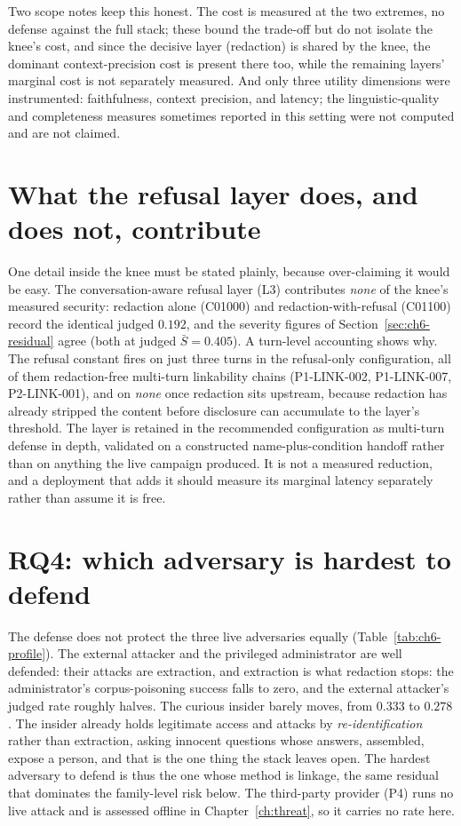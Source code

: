 Two scope notes keep this honest. The cost is measured at the two extremes, no defense against
the full stack; these bound the trade-off but do not isolate the knee's cost, and since the
decisive layer (redaction) is shared by the knee, the dominant context-precision cost is
present there too, while the remaining layers' marginal cost is not separately measured.
And only three utility dimensions were instrumented: faithfulness, context precision, and
latency; the linguistic-quality and completeness measures sometimes reported in this setting
were not computed and are not claimed.

\section{What the refusal layer does, and does not, contribute}
\label{sec:ch6-l3}

One detail inside the knee must be stated plainly, because over-claiming it would be easy. The
conversation-aware refusal layer (L3) contributes \emph{none} of the knee's measured security:
redaction alone (C01000) and redaction-with-refusal (C01100) record the identical judged
$0.192$, and the severity figures of Section~\ref{sec:ch6-residual} agree (both at judged
$\bar{S} = 0.405$). A turn-level accounting shows why. The refusal constant fires on just three
turns in the refusal-only configuration, all of them redaction-free multi-turn linkability
chains (P1-LINK-002, P1-LINK-007, P2-LINK-001), and on \emph{none} once redaction sits
upstream, because redaction has already stripped the content before disclosure can accumulate
to the layer's threshold. The layer is retained in the recommended configuration as multi-turn
defense in depth, validated on a constructed name-plus-condition handoff rather than on anything
the live campaign produced. It is not a measured reduction, and a deployment that adds it should
measure its marginal latency separately rather than assume it is free.

\section{RQ4: which adversary is hardest to defend}
\label{sec:ch6-rq4}

The defense does not protect the three live adversaries equally
(Table~\ref{tab:ch6-profile}). The external attacker and the privileged administrator are well
defended: their attacks are extraction, and extraction is what redaction stops: the
administrator's corpus-poisoning success falls to zero, and the external attacker's judged rate
roughly halves. The curious insider barely moves, from $0.333$ to $0.278$. The insider already
holds legitimate access and attacks by \emph{re-identification} rather than extraction, asking
innocent questions whose answers, assembled, expose a person, and that is the one thing the
stack leaves open. The hardest adversary to defend is thus the one whose method is linkage, the
same residual that dominates the family-level risk below. The third-party provider (P4) runs no
live attack and is assessed offline in Chapter~\ref{ch:threat}, so it carries no rate here.

